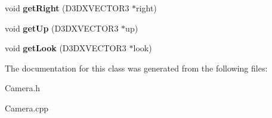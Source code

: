 \begin{DoxyCompactItemize}
\item 
\hypertarget{class_camera_a70c3d50d23eb1094d29f1d9cc2328800}{void {\bfseries get\-Right} (D3\-D\-X\-V\-E\-C\-T\-O\-R3 $\ast$right)}\label{class_camera_a70c3d50d23eb1094d29f1d9cc2328800}

\item 
\hypertarget{class_camera_aba494d36700de3b9c978e1a881aaa401}{void {\bfseries get\-Up} (D3\-D\-X\-V\-E\-C\-T\-O\-R3 $\ast$up)}\label{class_camera_aba494d36700de3b9c978e1a881aaa401}

\item 
\hypertarget{class_camera_a6b9a394dc61e678e44dd9f4331871f52}{void {\bfseries get\-Look} (D3\-D\-X\-V\-E\-C\-T\-O\-R3 $\ast$look)}\label{class_camera_a6b9a394dc61e678e44dd9f4331871f52}

\end{DoxyCompactItemize}


The documentation for this class was generated from the following files\-:\begin{DoxyCompactItemize}
\item 
Camera.\-h\item 
Camera.\-cpp\end{DoxyCompactItemize}
